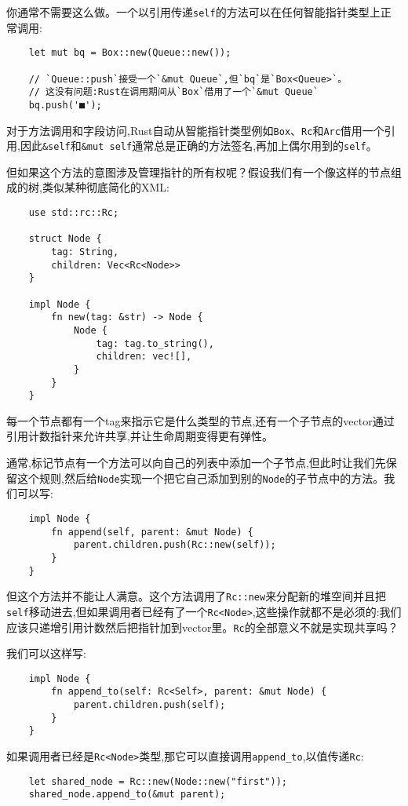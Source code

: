 你通常不需要这么做。一个以引用传递\texttt{self}的方法可以在任何智能指针类型上正常调用:
\begin{verbatim}
    let mut bq = Box::new(Queue::new());

    // `Queue::push`接受一个`&mut Queue`,但`bq`是`Box<Queue>`。
    // 这没有问题:Rust在调用期间从`Box`借用了一个`&mut Queue`
    bq.push('■');
\end{verbatim}

对于方法调用和字段访问,Rust自动从智能指针类型例如\texttt{Box}、\texttt{Rc}和\texttt{Arc}借用一个引用,因此\texttt{\&self}和\texttt{\&mut self}通常总是正确的方法签名,再加上偶尔用到的\texttt{self}。

但如果这个方法的意图涉及管理指针的所有权呢？假设我们有一个像这样的节点组成的树,类似某种彻底简化的XML:
\begin{verbatim}
    use std::rc::Rc;

    struct Node {
        tag: String,
        children: Vec<Rc<Node>>
    }

    impl Node {
        fn new(tag: &str) -> Node {
            Node {
                tag: tag.to_string(),
                children: vec![],
            }
        }
    }
\end{verbatim}

每一个节点都有一个tag来指示它是什么类型的节点,还有一个子节点的vector通过引用计数指针来允许共享,并让生命周期变得更有弹性。

通常,标记节点有一个方法可以向自己的列表中添加一个子节点,但此时让我们先保留这个规则,然后给\texttt{Node}实现一个把它自己添加到别的\texttt{Node}的子节点中的方法。我们可以写:
\begin{verbatim}
    impl Node {
        fn append(self, parent: &mut Node) {
            parent.children.push(Rc::new(self));
        }
    }
\end{verbatim}

但这个方法并不能让人满意。这个方法调用了\texttt{Rc::new}来分配新的堆空间并且把\texttt{self}移动进去,但如果调用者已经有了一个\texttt{Rc<Node>},这些操作就都不是必须的:我们应该只递增引用计数然后把指针加到vector里。\texttt{Rc}的全部意义不就是实现共享吗？

我们可以这样写:
\begin{verbatim}
    impl Node {
        fn append_to(self: Rc<Self>, parent: &mut Node) {
            parent.children.push(self);
        }
    }
\end{verbatim}

如果调用者已经是\texttt{Rc<Node>}类型,那它可以直接调用\texttt{append\_to},以值传递\texttt{Rc}:
\begin{verbatim}
    let shared_node = Rc::new(Node::new("first"));
    shared_node.append_to(&mut parent);
\end{verbatim}

